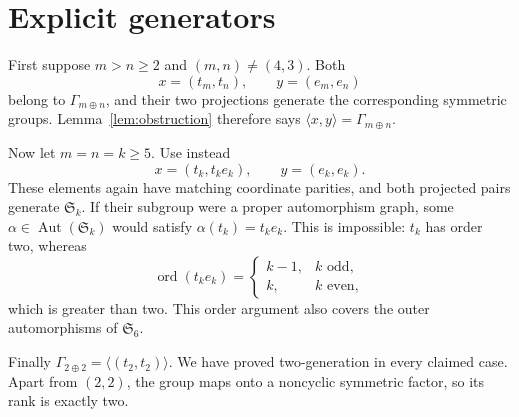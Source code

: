 \documentclass[11pt]{article}
\newcommand{\Sym}{\mathfrak S}
\begin{document}
\section{Explicit generators}
First suppose $m>n\ge2$ and $(m,n)\ne(4,3)$. Both
\[
x=(t_m,t_n),\qquad y=(e_m,e_n) \tag{1}
\]
belong to $\Gamma_{m\oplus n}$, and their two projections generate the corresponding symmetric groups. Lemma~\ref{lem:obstruction} therefore says $\langle x,y\rangle=\Gamma_{m\oplus n}$.

Now let $m=n=k\ge5$. Use instead
\[
x=(t_k,t_ke_k),\qquad y=(e_k,e_k). \tag{2}
\]
These elements again have matching coordinate parities, and both projected pairs generate $\Sym_k$. If their subgroup were a proper automorphism graph, some $\alpha\in\operatorname{Aut}(\Sym_k)$ would satisfy $\alpha(t_k)=t_ke_k$. This is impossible: $t_k$ has order two, whereas
\[
\operatorname{ord}(t_ke_k)=\begin{cases}k-1,&k\text{ odd},\\k,&k\text{ even},\end{cases}
\]
which is greater than two. This order argument also covers the outer automorphisms of $\Sym_6$.

Finally $\Gamma_{2\oplus2}=\langle(t_2,t_2)\rangle$. We have proved two-generation in every claimed case. Apart from $(2,2)$, the group maps onto a noncyclic symmetric factor, so its rank is exactly two.
\end{document}

